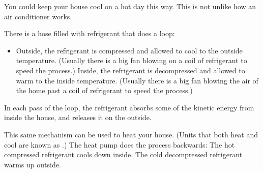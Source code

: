 You could keep your house cool on a hot day this way. This is not unlike how an air conditioner works.

There is a hose filled with refrigerant that does a loop: 
\begin{itemize}
\item Outside, the refrigerant is compressed and allowed to cool to the outside temperature. (Usually there is a big fan blowing on a coil of refrigerant to speed the process.)
Inside, the refrigerant is decompressed and allowed to warm to the inside temperature. (Usually there is a big fan blowing the air of the home past a coil of refrigerant to speed the process.)
\end{itemize}

In each pass of the loop, the refrigerant absorbs some of the kinetic energy from inside the house, and releases it on the outside.

This same mechanism can be used to heat your house. (Units that both heat and cool are known as .) 
The heat pump does the process backwards: The hot compressed refrigerant cools down inside. The cold decompressed refrigerant warms up outside.

